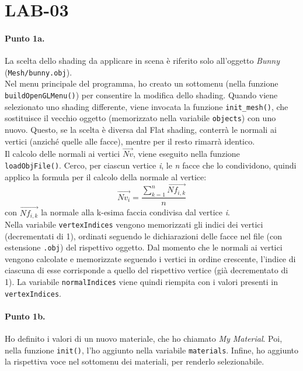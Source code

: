 \documentclass[a4paper, 12pt]{article}
\begin{document}
\section{LAB-03}

\paragraph{Punto 1a.}
La scelta dello shading da applicare in scena è riferito solo all'oggetto \textit{Bunny} (\texttt{Mesh/bunny.obj}).\\
Nel menu principale del programma, ho creato un sottomenu (nella funzione \texttt{buildOpenGLMenu()}) per consentire la modifica dello shading. Quando viene selezionato uno shading differente, viene invocata la funzione \texttt{init\_mesh()}, che sostituisce il vecchio oggetto (memorizzato nella variabile \texttt{objects}) con uno nuovo. Questo, se la scelta è diversa dal Flat shading, conterrà le normali ai vertici (anziché quelle alle facce), mentre per il resto rimarrà identico.\\
Il calcolo delle normali ai vertici $\overrightarrow{Nv}$, viene eseguito nella funzione \texttt{loadObjFile()}. Cerco, per ciascun vertice \textit{i}, le \textit{n} facce che lo condividono, quindi applico la formula per il calcolo della normale al vertice:
\[ \overrightarrow{Nv_i} = \frac{\sum_{k=1}^n \overrightarrow{Nf_{i,k}}}{n} \]
con $\overrightarrow{Nf_{i,k}}$ la normale alla k-esima faccia condivisa dal vertice \textit{i}.\\
Nella variabile \texttt{vertexIndices} vengono memorizzati gli indici dei vertici (decrementati di 1), ordinati seguendo le dichiarazioni delle facce nel file (con estensione \texttt{.obj}) del rispettivo oggetto. Dal momento che le normali ai vertici vengono calcolate e memorizzate seguendo i vertici in ordine crescente, l'indice di ciascuna di esse corrisponde a quello del rispettivo vertice (già decrementato di 1). La variabile \texttt{normalIndices} viene quindi riempita con i valori presenti in \texttt{vertexIndices}.

\paragraph{Punto 1b.}
Ho definito i valori di un nuovo materiale, che ho chiamato \textit{My Material}. Poi, nella funzione \texttt{init()}, l'ho aggiunto nella variabile \texttt{materials}. Infine, ho aggiunto la rispettiva voce nel sottomenu dei materiali, per renderlo selezionabile.
\end{document}
